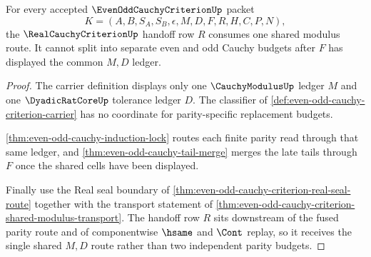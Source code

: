 \begin{theorem}
\label{thm:even-odd-cauchy-single-modulus}
For every accepted $\EvenOddCauchyCriterionUp$ packet
$$
K=(A,B,S_A,S_B,\epsilon,M,D,F,R,H,C,P,N),
$$
the $\RealCauchyCriterionUp$ handoff row $R$ consumes one shared modulus route. It cannot split into separate even and odd Cauchy budgets after $F$ has displayed the common $M,D$ ledger.
\end{theorem}
\begin{proof}
The carrier definition displays only one $\CauchyModulusUp$ ledger $M$ and one $\DyadicRatCoreUp$ tolerance ledger $D$. The classifier of \autoref{def:even-odd-cauchy-criterion-carrier} has no coordinate for parity-specific replacement budgets.

\autoref{thm:even-odd-cauchy-induction-lock} routes each finite parity read through that same ledger, and \autoref{thm:even-odd-cauchy-tail-merge} merges the late tails through $F$ once the shared cells have been displayed.

Finally use the Real seal boundary of \autoref{thm:even-odd-cauchy-criterion-real-seal-route} together with the transport statement of \autoref{thm:even-odd-cauchy-criterion-shared-modulus-transport}. The handoff row $R$ sits downstream of the fused parity route and of componentwise $\hsame$ and $\Cont$ replay, so it receives the single shared $M,D$ route rather than two independent parity budgets.
\end{proof}

